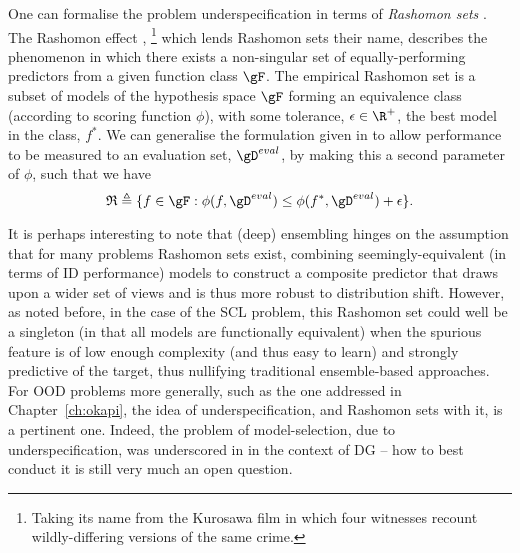 %
One can formalise the problem underspecification in terms of \emph{Rashomon sets}
\citep{semenova2019study}.
The Rashomon effect \citep{breiman2001statistical},
%
\footnote{
  Taking its name from the Kurosawa film in which four witnesses recount wildly-differing versions
  of the same crime.
%
}
%
which lends Rashomon sets their name, describes the phenomenon in which there exists a
non-singular set of equally-performing predictors from a given function class $\gF$.
%
 The empirical Rashomon set is a subset of models of the hypothesis space $\gF$ forming an
 equivalence class (according to scoring function $\phi$), with some tolerance, $\epsilon \in \R^+$, \wrt{}
 the best model in the class, $f^\ast$. 
%
We can generalise the formulation given in \citet{semenova2019study} to allow performance to be
measured \wrt{} to an evaluation set,  $\gD^{eval}$, by making this a second parameter of
$\phi$, such that we have
%
\begin{equation*}
  \mathfrak{R} \triangleq 
  \{ 
    f \in \gF: \phi(f, \gD^{eval}) 
    \leq 
    \phi( f^\ast, \gD^{eval} ) + \epsilon 
  \}.
\end{equation*}

It is perhaps interesting to note that (deep) ensembling hinges on the assumption that for many
problems Rashomon sets exist, combining seemingly-equivalent (in terms of \ac{ID} performance)
models to construct a composite predictor that draws upon a wider set of views and is thus more
robust to distribution shift.
%
However, as noted before, in the case of the \ac{SCL} problem, this Rashomon set could well be a
singleton (in that all models are functionally equivalent) when the spurious feature is of low
enough complexity (and thus easy to learn) and strongly predictive of the target, thus nullifying
traditional ensemble-based approaches.
%
For \ac{OOD} problems more generally, such as the one addressed in Chapter~\ref{ch:okapi}, the idea
of underspecification, and Rashomon sets with it, is a pertinent one.
%
Indeed, the problem of model-selection, due to underspecification, was underscored in
\cite{gulrajani2020search} in the context of \ac{DG} -- how to best conduct it is still very much
an open question.

